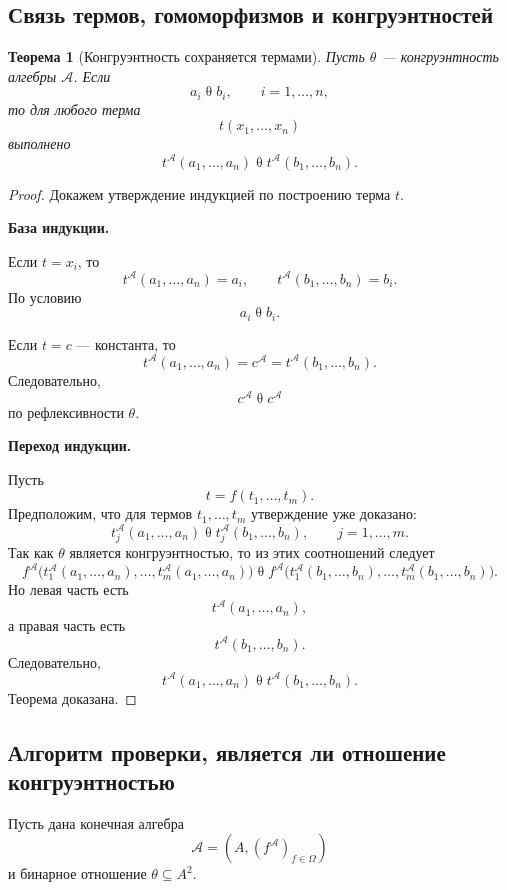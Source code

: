 \documentclass[12pt,a4paper]{article}
\newtheorem{theorem}{Теорема}
\begin{document}
\subsection{Связь термов, гомоморфизмов и конгруэнтностей}

\begin{theorem}[Конгруэнтность сохраняется термами]
Пусть $\theta$ --- конгруэнтность алгебры $\mathcal A$. Если
\[
a_i\mathrel{\theta}b_i,
\qquad i=1,\dots,n,
\]
то для любого терма
\[
t(x_1,\dots,x_n)
\]
выполнено
\[
t^{\mathcal A}(a_1,\dots,a_n)
\mathrel{\theta}
t^{\mathcal A}(b_1,\dots,b_n).
\]
\end{theorem}

\begin{proof}
Докажем утверждение индукцией по построению терма $t$.

\textbf{База индукции.}

Если $t=x_i$, то
\[
t^{\mathcal A}(a_1,\dots,a_n)=a_i,
\qquad
t^{\mathcal A}(b_1,\dots,b_n)=b_i.
\]
По условию
\[
a_i\mathrel{\theta}b_i.
\]

Если $t=c$ --- константа, то
\[
t^{\mathcal A}(a_1,\dots,a_n)=c^{\mathcal A}
=
t^{\mathcal A}(b_1,\dots,b_n).
\]
Следовательно,
\[
c^{\mathcal A}\mathrel{\theta}c^{\mathcal A}
\]
по рефлексивности $\theta$.

\textbf{Переход индукции.}

Пусть
\[
t=f(t_1,\dots,t_m).
\]
Предположим, что для термов $t_1,\dots,t_m$ утверждение уже доказано:
\[
t_j^{\mathcal A}(a_1,\dots,a_n)
\mathrel{\theta}
t_j^{\mathcal A}(b_1,\dots,b_n),
\qquad j=1,\dots,m.
\]
Так как $\theta$ является конгруэнтностью, то из этих соотношений следует
\[
f^{\mathcal A}
\bigl(
t_1^{\mathcal A}(a_1,\dots,a_n),
\dots,
t_m^{\mathcal A}(a_1,\dots,a_n)
\bigr)
\mathrel{\theta}
f^{\mathcal A}
\bigl(
t_1^{\mathcal A}(b_1,\dots,b_n),
\dots,
t_m^{\mathcal A}(b_1,\dots,b_n)
\bigr).
\]
Но левая часть есть
\[
t^{\mathcal A}(a_1,\dots,a_n),
\]
а правая часть есть
\[
t^{\mathcal A}(b_1,\dots,b_n).
\]
Следовательно,
\[
t^{\mathcal A}(a_1,\dots,a_n)
\mathrel{\theta}
t^{\mathcal A}(b_1,\dots,b_n).
\]
Теорема доказана.
\end{proof}

\subsection{Алгоритм проверки, является ли отношение конгруэнтностью}

Пусть дана конечная алгебра
\[
\mathcal A=(A,(f^{\mathcal A})_{f\in\Omega})
\]
и бинарное отношение $\theta\subseteq A^2$.
\end{document}

